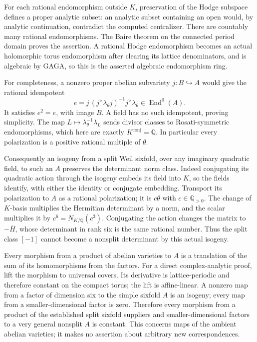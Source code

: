 For each rational endomorphism outside \(K\), preservation of the
Hodge subspace defines a proper analytic subset: an analytic subset
containing an open would, by analytic continuation, contradict the
computed centralizer. There are countably many rational endomorphisms.
The Baire theorem on the connected period domain proves the assertion.
A rational Hodge endomorphism becomes an actual holomorphic torus
endomorphism after clearing its lattice denominators, and is algebraic
by GAGA, so this is the asserted algebraic endomorphism ring.

For completeness, a nonzero proper abelian subvariety
\(j:B\hookrightarrow A\) would give the rational idempotent
\[
 e=j\,(j^\vee\lambda_\theta j)^{-1}j^\vee\lambda_\theta
       \in\operatorname{End}^0(A).
\]
It satisfies \(e^2=e\), with image \(B\). A field has no such
idempotent, proving simplicity. The map
\(L\mapsto\lambda_\theta^{-1}\lambda_L\) sends divisor classes
to Rosati-symmetric endomorphisms, which here are exactly
\(K^{\mathrm{conj}}=\mathbb Q\). In particular every polarization
is a positive rational multiple of \(\theta\).

Consequently an isogeny from a split Weil sixfold, over any imaginary
quadratic field, to such an \(A\) preserves the determinant norm
class. Indeed conjugating its quadratic action through the isogeny
embeds its field into \(K\), so the fields identify, with either
the identity or conjugate embedding. Transport its polarization to
\(A\) as a rational polarization; it is \(c\theta\) with
\(c\in\mathbb Q_{>0}\). The change of \(K\)-basis multiplies
the Hermitian determinant by a norm, and the scalar multiplies it
by \(c^6=N_{K/\mathbb Q}(c^3)\). Conjugating the action changes
the matrix to \(-\overline H\), whose determinant in rank six
is the same rational number. Thus the split class \([-1]\)
cannot become a nonsplit determinant by this actual isogeny.

Every morphism from a product of abelian varieties to \(A\) is a
translation of the sum of its homomorphisms from the factors.
For a direct complex-analytic proof, lift the morphism to universal
covers. Its derivative is lattice-periodic and therefore constant
on the compact torus; the lift is affine-linear. A nonzero map from
a factor of dimension six to the simple sixfold \(A\) is an isogeny;
every map from a smaller-dimensional factor is zero. Therefore every
morphism from a product of the established split sixfold suppliers
and smaller-dimensional factors to a very general nonsplit \(A\)
is constant. This concerns maps of the ambient abelian varieties;
it makes no assertion about arbitrary new correspondences.

